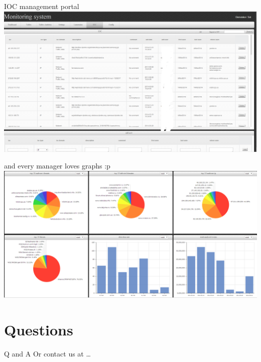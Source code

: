 \documentclass[presentation,smaller]{beamer}
\begin{document}
\begin{frame}[label=sec-7-9]{IOC management portal}
\includegraphics[width=.9\linewidth]{images/ioc01.png}
\end{frame}

\begin{frame}[label=sec-7-10]{and every manager loves graphs :p}
\includegraphics[width=.9\linewidth]{images/ioc02.png}
\end{frame}

\section{Questions}
\label{sec-8}
\begin{frame}[label=sec-8-1]{Q and A}
Or contact us at \ldots{}
\end{frame}
\end{document}
